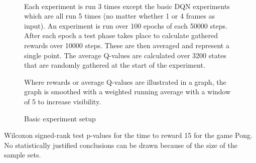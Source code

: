 \begin{figure}[]
  \paragraph{}
  Each experiment is run 3 times
  except the basic DQN experiments which are all run 5 times
  (no matter whether 1 or 4 frames as input).
  An experiment is run over 100 epochs of each 50000 steps.
  After each epoch a test phase takes place to calculate gathered rewards
  over 10000 steps.
  These are then averaged and represent a single point.
  The average Q-values are calculated over 3200 states
  that are randomly gathered at the start of the experiment.

  Where rewards or average Q-values are illustrated in a graph,
  the graph is smoothed with a weighted running average
  with a window of 5
  to increase visibility.

  \caption{Basic experiment setup}
  \label{fig:basic_setup}
\end{figure}

\begin{table}
  \center
  
  \caption{
    Wilcoxon signed-rank test p-values
    for the time to reward 15
    for the game Pong.
    No statistically justified conclusions can be drawn because of
    the size of the sample sets.
  }
\end{table}
